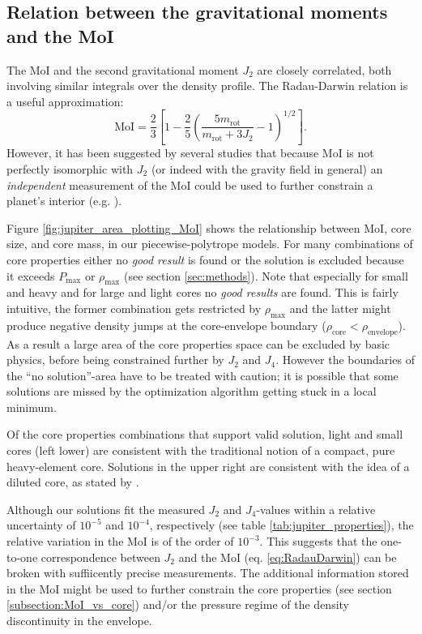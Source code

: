 \documentclass[usenatbib]{mnras}
\newcommand{\sub}[1]{_{\text{#1}}}
\begin{document}
\subsection{Relation between the gravitational moments and the MoI} \label{subsection:MoI_vs_J2}
The MoI and the second gravitational moment $J_2$ are closely correlated, both involving similar integrals over the density profile. The Radau-Darwin relation \citep[e.g.][]{Helled2011_jup} is a useful approximation:
\begin{equation}
    \text{MoI}= \frac{2}{3} \left[ 1 -  \frac{2}{5} \left( \frac{5m\sub{rot}}{m\sub{rot}+3J_2} -1 \right)^{1/2} \right].
    \label{eq:RadauDarwin}
\end{equation}
However, it has been suggested by several studies that because MoI is not perfectly isomorphic with $J_{2}$ (or indeed with the gravity field in general) an \emph{independent} measurement of the MoI could be used to further constrain a planet's interior (e.g. \cite{HELLED2011440}).

Figure \ref{fig:jupiter_area_plotting_MoI} shows the relationship between MoI, core size, and core mass, in our piecewise-polytrope models.
For many combinations of core properties either no \textit{good result} is found or the solution is excluded because it exceeds $P\sub{max}$ or $\rho\sub{max}$ (see section \ref{sec:methods}). Note that especially for small and heavy and for large and light cores no \textit{good results} are found. This is fairly intuitive, the former combination gets restricted by $\rho\sub{max}$ and the latter might produce negative density jumps at the core-envelope boundary ($\rho\sub{core}<\rho\sub{envelope}$). As a result a large area of the core properties space can be excluded by basic physics, before being constrained further by $J_2$ and $J_4$. However the boundaries of the ``no solution''-area have to be treated with caution; it is possible that some solutions are missed by the optimization algorithm getting stuck in a local minimum.

Of the core properties combinations that support valid solution, light and small cores (left lower) are consistent with the traditional notion of a compact, pure heavy-element core. Solutions in the upper right are consistent with the idea of a diluted core, as stated by \cite{2017Wahl}.

Although our solutions fit the measured $J_2$ and $J_4$-values within a relative uncertainty of $10^{-5}$ and $10^{-4}$, respectively (see table \ref{tab:jupiter_properties}), the relative variation in the MoI is of the order of $10^{-3}$. This suggests that the one-to-one correspondence between $J_2$ and the MoI (eq. \ref{eq:RadauDarwin}) can be broken with suffiicently precise measurements. 
The additional information stored in the MoI might be used to further constrain the core properties (see section \ref{subsection:MoI_vs_core}) and/or the pressure regime of the density discontinuity in the envelope. 
\end{document}
